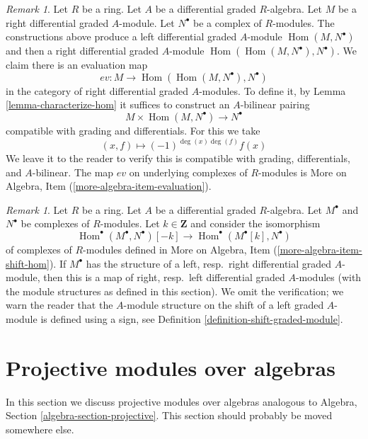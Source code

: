 \documentclass{stacks-project}
\theoremstyle{plain}
\theoremstyle{definition}
\theoremstyle{remark}
\newtheorem{remark}[subsection]{Remark}
\numberwithin{equation}{subsection}
\def\Hom{\mathop{\mathrm{Hom}}\nolimits}
\begin{document}
\begin{remark}
\label{remark-evaluation-map-right}
Let $R$ be a ring. Let $A$ be a differential graded $R$-algebra.
Let $M$ be a right differential graded $A$-module. Let
$N^\bullet$ be a complex of $R$-modules. The constructions above
produce a left differential graded $A$-module $\Hom(M, N^\bullet)$
and then a right differential graded $A$-module
$\Hom(\Hom(M, N^\bullet), N^\bullet)$. We claim there is an evaluation map
$$
ev : M \longrightarrow \Hom(\Hom(M, N^\bullet), N^\bullet)
$$
in the category of right differential graded $A$-modules. To define it, by
Lemma \ref{lemma-characterize-hom} it suffices to construct an
$A$-bilinear pairing
$$
M \times \Hom(M, N^\bullet) \longrightarrow N^\bullet
$$
compatible with grading and differentials. For this we take
$$
(x, f) \longmapsto (-1)^{\deg(x)\deg(f)}f(x)
$$
We leave it to the reader to verify this is compatible with grading,
differentials, and $A$-bilinear. The map $ev$ on underlying complexes
of $R$-modules is More on Algebra, Item (\ref{more-algebra-item-evaluation}).
\end{remark}

\begin{remark}
\label{remark-shift-dual}
Let $R$ be a ring. Let $A$ be a differential graded $R$-algebra.
Let $M^\bullet$ and $N^\bullet$ be complexes of $R$-modules.
Let $k \in \mathbf{Z}$ and consider the isomorphism
$$
\Hom^\bullet(M^\bullet, N^\bullet)[-k]
\longrightarrow
\Hom^\bullet(M^\bullet[k], N^\bullet)
$$
of complexes of $R$-modules defined in
More on Algebra, Item (\ref{more-algebra-item-shift-hom}).
If $M^\bullet$ has the structure of a left, resp.\ right
differential graded $A$-module, then this is a map of
right, resp.\ left differential graded $A$-modules (with the
module structures as defined in this section).
We omit the verification; we warn the reader that the
$A$-module structure on the shift of a left graded $A$-module
is defined using a sign, see
Definition \ref{definition-shift-graded-module}.
\end{remark}






\section{Projective modules over algebras}
\label{section-projectives-over-algebras}

\noindent
In this section we discuss projective modules over algebras analogous to
Algebra, Section \ref{algebra-section-projective}.
This section should probably be moved somewhere else.
\end{document}
